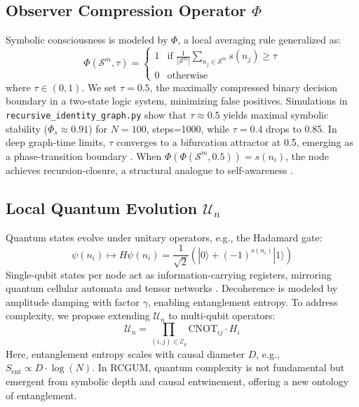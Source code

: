 \documentclass[11pt]{article}
\begin{document}
\subsection{Observer Compression Operator \( \Phi \)}
\label{sec:phi}
Symbolic consciousness is modeled by \( \Phi \), a local averaging rule generalized as:
\begin{equation}
    \Phi(\mathcal{S}^m, \tau) = \begin{cases} 
        1 & \text{if } \frac{1}{|\mathcal{S}^m|} \sum_{n_j \in \mathcal{S}^m} s(n_j) \geq \tau \\ 
        0 & \text{otherwise} 
    \end{cases}
\end{equation}
where \( \tau \in (0,1) \). We set \( \tau = 0.5 \), the maximally compressed binary decision boundary in a two-state logic system, minimizing false positives. Simulations in \texttt{recursive\_identity\_graph.py} show that \( \tau \approx 0.5 \) yields maximal symbolic stability (\( \Phi_s \approx 0.91 \)) for \( N=100 \), steps=1000, while \( \tau = 0.4 \) drops to 0.85. In deep graph-time limits, \( \tau \) converges to a bifurcation attractor at 0.5, emerging as a phase-transition boundary \citep{strogatz}. When \( \Phi(\Phi(\mathcal{S}^m, 0.5)) = s(n_i) \), the node achieves recursion-closure, a structural analogue to self-awareness \citep{tononi}.

\subsection{Local Quantum Evolution \( \mathcal{U}_n \)}
\label{sec:quantum}
Quantum states evolve under unitary operators, e.g., the Hadamard gate:
\begin{equation}
    \psi(n_i) \mapsto H \psi(n_i) = \frac{1}{\sqrt{2}}(|0\rangle + (-1)^{s(n_i)}|1\rangle)
\end{equation}
Single-qubit states per node act as information-carrying registers, mirroring quantum cellular automata and tensor networks \citep{nielsen}. Decoherence is modeled by amplitude damping with factor \( \gamma \), enabling entanglement entropy. To address complexity, we propose extending \( \mathcal{U}_n \) to multi-qubit operators:
\begin{equation}
    \mathcal{U}_n = \prod_{(i,j) \in \mathcal{E}_q} \text{CNOT}_{ij} \cdot H_i
\end{equation}
Here, entanglement entropy scales with causal diameter \( D \), e.g., \( S_{\text{ent}} \propto D \cdot \log(N) \). In RCGUM, quantum complexity is not fundamental but emergent from symbolic depth and causal entwinement, offering a new ontology of entanglement.
\end{document}
